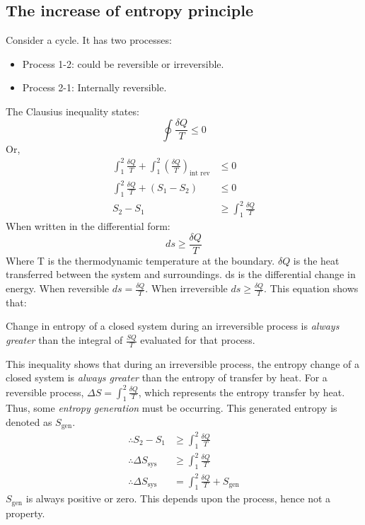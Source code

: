 \documentclass[class=report, crop=false, 12pt,a4paper]{standalone}
\numberwithin{equation}{section}
\begin{document}
\subsection{The increase of entropy principle}
Consider a cycle. It has two processes:
\begin{itemize}[noitemsep]
  \item Process 1-2: could be reversible or irreversible.
  \item Process 2-1: Internally reversible.
\end{itemize}
The Clausius inequality states:
\begin{equation} 
  \oint \frac{\delta Q}{T} \leq 0 
\end{equation}
Or,
\begin{align}
  \int_1^2 \frac{\delta Q}{T} + \int_1^2\left( \frac{\delta Q}{T} \right)_{\textrm{int rev}} &\leq 0 \\
  \int_1^2 \frac{\delta Q}{T} + (S_1 - S_2) &\leq 0 \\
  S_2 - S_1 &\geq \int_1^2 \frac{\delta Q}{T}
\end{align}
When written in the differential form:
\begin{equation} 
  ds \geq \frac{\delta Q}{T} 
\end{equation}
Where T is the thermodynamic temperature at the boundary. \( \delta Q \) is the heat transferred between the system and surroundings. ds is the differential change in energy. When reversible \( ds = \frac{\delta Q}{T} \). When irreversible \( ds \geq \frac{\delta Q}{T} \). This equation shows that:
\begin{center}
  Change in entropy of a closed system during an irreversible process is \emph{always greater} than the integral of \(\frac{SQ}{T}\) evaluated for that process.
\end{center}
This inequality shows that during an irreversible process, the entropy  change of a closed system is \emph{always greater} than the entropy of transfer by heat. For a reversible process, \( \Delta S = \int_1^2 \frac{\delta Q}{T} \), which represents the entropy transfer by heat. Thus, some \emph{entropy generation} must be occurring. This generated entropy is denoted as \(S_{\textrm{gen}}\).
\begin{align}
  \therefore S_2 - S_1 &\geq \int_1^2 \frac{\delta Q}{T} \\
  \therefore \Delta S_{\textrm{sys}} &\geq \int_1^2 \frac{\delta Q}{T} \\ 
  \therefore \Delta S_{\textrm{sys}} &= \int_1^2 \frac{\delta Q}{T} + S_{\textrm{gen}}
\end{align}
\( S_{\textrm{gen}} \) is always positive or zero. This depends upon the process, hence not a property.
\end{document}
